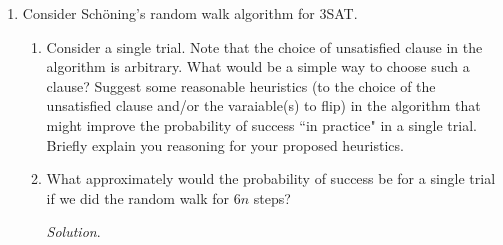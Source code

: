 \documentclass[11pt]{article}
\newcommand{\Exp}{\mathbb{E}}
\begin{document}
\begin{enumerate}[leftmargin=16pt]
\begin{proof}
        By construction of the algorithm, $|N_B(v)| - |N_A(v)| > 0$ implies $\Exp_{i}|A - \Exp_{i}|B > 0$ and
        $$
        \sum_{e \in E} (\Exp_{e,i} | A - \Exp_{e,i} | B) > 0 \implies \sum_{e \in E} \Exp_{e,i} | A > \sum_{e \in E} \Exp_{e,i} | B
        $$
        Assume that for $j < i$, it holds that
        \begin{equation} \label{eq:ind-hyp}
            \Exp[|E(A,B)| \mid X_1 = x_1, \ldots, X_{j-1} = x_{j-1}, X_j = x_j] \geq \Exp[|E(A,B)|]
        \end{equation}
        By inductive hypothesis (\ref{eq:ind-hyp}), either
        $$
        \Exp[|E(A,B)| \mid X_1 = x_1, \ldots, X_i = 1] \geq \Exp[|E(A,B)|]
        $$
        or
        $$
        \Exp[|E(A,B)| \mid X_1 = x_1, \ldots, X_i = 0] \geq \Exp[|E(A,B)|]
        $$
        so it follows that
        $$
        \max\{\Exp[|E(A,B)| \mid X_1 = x_1, \ldots, X_i = 0],\,\Exp[|E(A,B)| \mid X_1 = x_1, \ldots, X_i = 1]\} \geq \Exp[|E(A,B)|]
        $$
        Hence, by placing $v$ in $A$ when $\sum_{e \in E} \Exp_{e,i} | A > \sum_{e \in E} \Exp_{e,i} | B$ and vice versa, we ensures that
        \begin{equation} \label{eq:cut-size-increasing}
            \begin{aligned}
                \Exp[|E(A,B)| \mid X_1 = x_1, \ldots, X_{i-1} = x_{i-1}, X_i = x_i] &\geq \Exp[|E(A,B)| \mid X_1 = x_1, \ldots, X_{i-1} = x_{i-1}]  \\
                &\geq \Exp[|E(A,B)|]
            \end{aligned}
        \end{equation}
        Since $\Exp[|E(A,B)|] = |E| / 2$, the result follows from induction.
    \end{proof}

    \item Consider Sch\"oning's random walk algorithm for 3SAT.
    \begin{enumerate}
        \item Consider a single trial. Note that the choice of unsatisfied clause in the algorithm is arbitrary. What would be a simple way to choose such a clause? Suggest some reasonable heuristics (to the choice of the unsatisfied clause and/or the varaiable(s) to flip) in the algorithm that might improve the probability of success ``in practice" in a single trial. Briefly explain you reasoning for your proposed heuristics.        
        \item What approximately would the probability of success be for a single trial if we did the random walk for $6n$ steps?
        
        \textit{Solution}. 
    \end{enumerate}
\end{enumerate}
\end{document}
